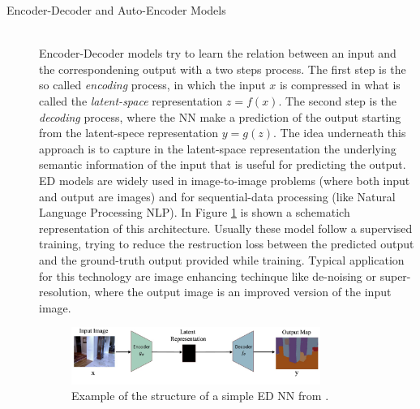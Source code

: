 \begin{description}
    \item [Encoder-Decoder and Auto-Encoder Models] \hfill \\
        Encoder-Decoder models try to learn the relation between an input and the correspondening output with a two steps process. The first step is the so called \textit{encoding} process, in which the input $x$ is compressed in what is called the \textit{latent-space} representation $z = f(x)$. The second step is the \textit{decoding} process, where the NN make a prediction of the output starting from the latent-spece representation $ y = g(z)$. The idea underneath this approach is to capture in the latent-space representation the underlying semantic information of the input that is useful for predicting the output. ED models are widely used in image-to-image problems (where both input and output are images) and for sequential-data processing (like Natural Language Processing NLP). In Figure \ref{fig:EDNN} is shown a schematich representation of this architecture. Usually these model follow a supervised training, trying to reduce the restruction loss between the predicted output and the ground-truth output provided while training. Typical application for this technology are image enhancing techinque like de-noising or super-resolution, where the output image is an improved version of the input image.

        \begin{figure}
            \centering
            \includegraphics[width = 0.8\textwidth]{images/EDnet}
            \caption{Example of the structure of a simple ED NN from  \cite{deep_seg_SOA}.}
            \label{fig:EDNN}
        \end{figure}


\end{description}
